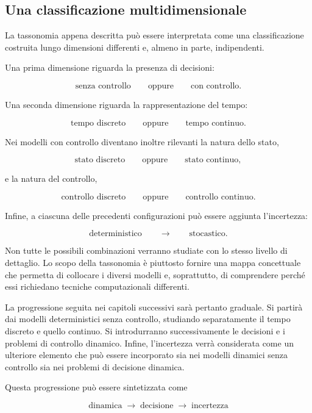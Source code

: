 \documentclass{book}
\begin{document}
\subsection{Una classificazione multidimensionale}

La tassonomia appena descritta può essere interpretata come una classificazione costruita lungo dimensioni differenti e, almeno in parte, indipendenti.

Una prima dimensione riguarda la presenza di decisioni:

$$
\text{senza controllo}
\qquad\text{oppure}\qquad
\text{con controllo}.
$$

Una seconda dimensione riguarda la rappresentazione del tempo:

$$
\text{tempo discreto}
\qquad\text{oppure}\qquad
\text{tempo continuo}.
$$

Nei modelli con controllo diventano inoltre rilevanti la natura dello stato,

$$
\text{stato discreto}
\qquad\text{oppure}\qquad
\text{stato continuo},
$$

e la natura del controllo,

$$
\text{controllo discreto}
\qquad\text{oppure}\qquad
\text{controllo continuo}.
$$

Infine, a ciascuna delle precedenti configurazioni può essere aggiunta l'incertezza:

$$
\text{deterministico}
\qquad\longrightarrow\qquad
\text{stocastico}.
$$

Non tutte le possibili combinazioni verranno studiate con lo stesso livello di dettaglio. Lo scopo della tassonomia è piuttosto fornire una mappa concettuale che permetta di collocare i diversi modelli e, soprattutto, di comprendere perché essi richiedano tecniche computazionali differenti.

La progressione seguita nei capitoli successivi sarà pertanto graduale. Si partirà dai modelli deterministici senza controllo, studiando separatamente il tempo discreto e quello continuo. Si introdurranno successivamente le decisioni e i problemi di controllo dinamico. Infine, l'incertezza verrà considerata come un ulteriore elemento che può essere incorporato sia nei modelli dinamici senza controllo sia nei problemi di decisione dinamica.

Questa progressione può essere sintetizzata come

$$
\boxed{
\text{dinamica}
\;\longrightarrow\;
\text{decisione}
\;\longrightarrow\;
\text{incertezza}
}
$$
\end{document}
